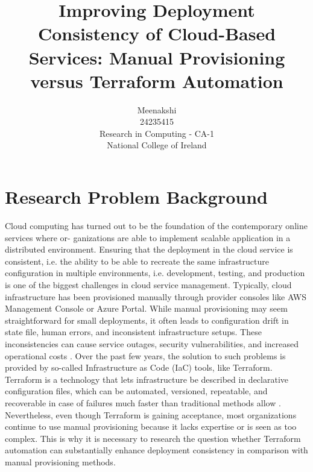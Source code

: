 \documentclass[10pt]{article}
\begin{document}
\title{\bf{Improving Deployment Consistency of Cloud-Based
Services: Manual Provisioning versus Terraform
Automation}}%
\author{Meenakshi \\ 24235415 \\ Research in Computing - CA-1 \\ National College of Ireland}%


\date{}%
\maketitle



\section{Research Problem Background}  
Cloud computing has turned out to be the foundation of the contemporary online services where or-
ganizations are able to implement scalable application in a distributed environment. Ensuring that the
deployment in the cloud service is consistent, i.e. the ability to be able to recreate the same infrastructure
configuration in multiple environments, i.e. development, testing, and production is one of the biggest
challenges in cloud service management. Typically, cloud infrastructure has been provisioned manually
through provider consoles like AWS Management Console or Azure Portal. While manual provisioning
may seem straightforward for small deployments, it often leads to configuration drift in state file, human
errors, and inconsistent infrastructure setups. These inconsistencies can cause service outages, security
vulnerabilities, and increased operational costs \cite{kasarla2025implementing}.
Over the past few years, the solution to such problems is provided by so-called Infrastructure as
Code (IaC) tools, like Terraform. Terraform is a technology that lets infrastructure be described in
declarative configuration files, which can be automated, versioned, repeatable, and recoverable in case
of failures much faster than traditional methods allow \cite{pohjola2025mitigating}. Nevertheless, even
though Terraform is gaining acceptance, most organizations continue to use manual provisioning because
it lacks expertise or is seen as too complex. This is why it is necessary to research the question whether
Terraform automation can substantially enhance deployment consistency in comparison with manual
provisioning methods.
\end{document}
